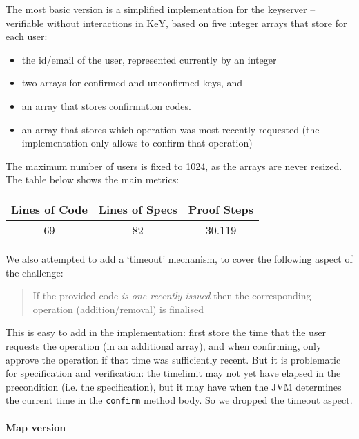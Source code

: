 \documentclass{llncs}
\begin{document}
The most basic version is a simplified implementation for the keyserver -- verifiable without interactions in KeY, based on five integer arrays that store for each user:

\begin{itemize}
\item the id/email of the user, represented currently by an integer
\item two arrays for confirmed and unconfirmed keys, and
\item an array that stores confirmation codes.
\item an array that stores which operation was most recently requested (the implementation only allows to confirm that operation)
\end{itemize}
The maximum number of users is fixed to 1024, as the arrays are never resized. The table below shows the main metrics:

\begin{center}
\begin{tabular}{ |c|c|c| } 
 \hline
 Lines of Code & Lines of Specs & Proof Steps \\
 \hline
 69 & 82 & 30.119 \\
 \hline
\end{tabular}
\end{center}



We also attempted to add a `timeout' mechanism, to cover the following aspect of the challenge:
\begin{quote}
If the provided code \emph{is one recently issued} then the corresponding operation (addition/removal) is finalised
\end{quote}
This is easy to add in the implementation: first store the time that the user requests the operation (in an additional array), and when confirming, only approve the operation if that time was sufficiently recent. But it is problematic for specification and verification: the timelimit may not yet have elapsed in the precondition (i.e. the specification), but it may have when the JVM determines the current time in the \verb|confirm| method body.
So we dropped the timeout aspect.

\paragraph{Map version}
\end{document}

